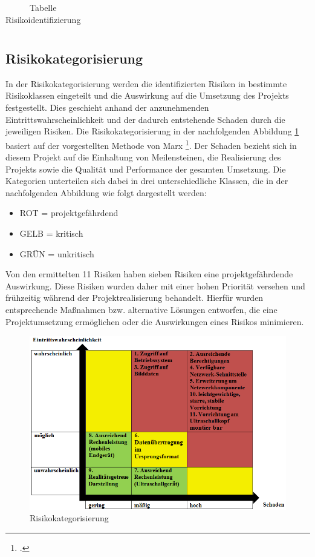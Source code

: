 \begin{center}
\begin{table} [H]
\begin{tabular}{ | p{} | p{} | p{} |}
    \end{tabular}
     \caption{{\small Tabelle Risikoidentifizierung}}
     \label{tab:Risikoidentifizierung}
    \end{table}
\end{center}

\subsection{Risikokategorisierung}
In der Risikokategorisierung werden die identifizierten Risiken in bestimmte Risikoklassen eingeteilt und die Auswirkung auf die Umsetzung des Projekts festgestellt. Dies geschieht anhand der anzunehmenden Eintrittswahrscheinlichkeit und der dadurch entstehende Schaden durch die jeweiligen Risiken. Die Risikokategorisierung in der nachfolgenden Abbildung \ref{fig:risikokategorisierung} basiert auf der vorgestellten Methode von Marx \footcite{Risikomanagement}. Der Schaden bezieht sich in diesem Projekt auf die Einhaltung von Meilensteinen, die Realisierung des Projekts sowie die Qualität und Performance der gesamten Umsetzung. Die Kategorien unterteilen sich dabei in drei unterschiedliche Klassen, die in der nachfolgenden Abbildung wie folgt dargestellt werden:
\begin{itemize}
\item ROT  = projektgefährdend
\item GELB = kritisch
\item GRÜN = unkritisch
\end{itemize}
Von den ermittelten 11 Risiken haben sieben Risiken eine projektgefährdende Auswirkung. Diese Risiken wurden daher mit einer hohen Priorität versehen und frühzeitig während der Projektrealisierung behandelt. Hierfür wurden entsprechende Maßnahmen bzw. alternative Lösungen entworfen, die eine Projektumsetzung ermöglichen oder die Auswirkungen eines Risikos minimieren. 
\begin{figure}[h]
	\centering
	\includegraphics[width=1\textwidth]{Bilder/Risiko_und_Anforderungsanalyse/Risikokategorisierung.png}
	\caption{Risikokategorisierung}
	\label{fig:risikokategorisierung}
\end{figure}

